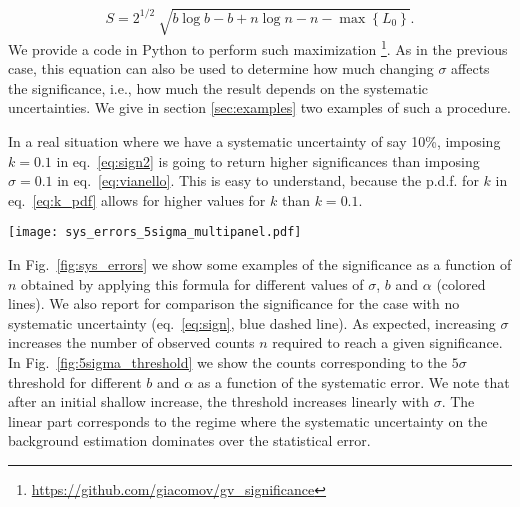 \documentclass[twocolumn]{aastex61}
\begin{document}
\begin{equation}
S = 2^{1/2}~\sqrt{ b \log{b} - b + n \log{n} - n  - \max{\left\{L_{0}\right\}}}.
\label{eq:vianello}
\end{equation}
We provide a code in Python to perform such maximization \footnote{\url{https://github.com/giacomov/gv\_significance}}.
As in the previous case, this equation can also be used to determine how much changing $\sigma$ affects the significance, i.e., how much the result depends on the systematic uncertainties. We give in section \ref{sec:examples} two examples of such a procedure. 

In a real situation where we have a systematic uncertainty of say 10\%, imposing $k=0.1$ in eq.~\ref{eq:sign2} is going to return higher significances than imposing $\sigma=0.1$ in eq.~\ref{eq:vianello}. This is easy to understand, because the p.d.f. for $k$ in eq.~\ref{eq:k_pdf} allows for higher values for $k$ than $k=0.1$. 

\begin{figure*}[tb]
\centering
\texttt{[image: sys\_errors\_5sigma\_multipanel.pdf]}
\caption{Observed counts $n$ needed to get a significance of $5\sigma$ as a function of the systematic uncertainty $\sigma$, for different values of $b$ and $\alpha$. The red dashed line is the threshold obtained with the formula from \citet{LiMa}, i.e., the case with no systematic errors.}
\label{fig:5sigma_threshold}
\end{figure*}

In Fig.~\ref{fig:sys_errors} we show some examples of the significance as a function of $n$ obtained by applying this formula for different values of $\sigma$, $b$ and $\alpha$ (colored lines). We also report for comparison the significance for the case with no systematic uncertainty (eq.~\ref{eq:sign}, blue dashed line). As expected, increasing $\sigma$ increases the number of observed counts $n$ required to reach a given significance. In Fig.~\ref{fig:5sigma_threshold} we show the counts corresponding to the $5\sigma$ threshold for different $b$ and $\alpha$ as a function of the systematic error. We note that after an initial shallow increase, the threshold increases linearly with $\sigma$. The linear part corresponds to the regime where the systematic uncertainty on the background estimation dominates over the statistical error.
\end{document}
